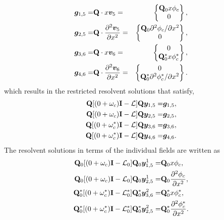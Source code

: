 \begin{align}
	\boldsymbol{g}_{1,5} =& 	\mathbf{Q}\cdot x\boldsymbol{v}_{5} =&
	\begin{Bmatrix}
		\mathbf{Q}_{0}x\phi_{c} \\
		0
	\end{Bmatrix}, \nonumber \\
	\boldsymbol{g}_{2,5} =& 	\mathbf{Q}\cdot \dfrac{\partial^{2}\boldsymbol{v}_{5}}{\partial x^{2}} =&
	\begin{Bmatrix}
		\mathbf{Q}_{0}\partial^{2}\phi_{c}/\partial x^{2}	\\
		0
	\end{Bmatrix}, \nonumber \\
	\boldsymbol{g}_{3,6} =& 	\mathbf{Q}\cdot x\boldsymbol{v}_{6} =&
	\begin{Bmatrix}
		0	\\
		\mathbf{Q}^{*}_{0}x\phi^{*}_{c}
	\end{Bmatrix}, \nonumber \\
	\boldsymbol{g}_{4,6} =& 	\mathbf{Q}\cdot \dfrac{\partial^{2}\boldsymbol{v}_{6}}{\partial x^{2}} =&
	\begin{Bmatrix}
		0	\\
		\mathbf{Q}^{*}_{0}\partial^{2}\phi^{*}_{c}/\partial x^{2}
	\end{Bmatrix}. \nonumber
\end{align}
 which results in the restricted resolvent solutions that satisfy,
 \begin{subequations}
 	\label{eqn:GL_resolvents}
	 \begin{align}
	 	\mathbf{Q}[(0 + \omega_{c})\mathbf{I} - \mathcal{L}]\mathbf{Q}\boldsymbol{y}_{1,5} =& \boldsymbol{g}_{1,5}, \\
	 	\mathbf{Q}[(0 + \omega_{c})\mathbf{I} - \mathcal{L}]\mathbf{Q}\boldsymbol{y}_{2,5} =& \boldsymbol{g}_{2,5}, \\
	 	\mathbf{Q}[(0 + \omega^{*}_{c})\mathbf{I} - \mathcal{L}]\mathbf{Q}\boldsymbol{y}_{3,6} =& \boldsymbol{g}_{3,6}, \\
	 	\mathbf{Q}[(0 + \omega^{*}_{c})\mathbf{I} - \mathcal{L}]\mathbf{Q}\boldsymbol{y}_{4,6} =& \boldsymbol{g}_{4,6}. 
	 \end{align}
\end{subequations}
The resolvent solutions in terms of the individual fields are written as
 \begin{subequations}
 	\label{eqn:GL_sub_resolvents}
	 \begin{align}
	 	\mathbf{Q}_{0}[(0 + \omega_{c})\mathbf{I} - \mathcal{L}_{0}]\mathbf{Q}_{0}\boldsymbol{y}^{1}_{1,5} =& \mathbf{Q}_{0}x\phi_{c}, \\
	 	\mathbf{Q}_{0}[(0 + \omega_{c})\mathbf{I} - \mathcal{L}_{0}]\mathbf{Q}_{0}\boldsymbol{y}^{1}_{2,5} =& \mathbf{Q}_{0}\dfrac{\partial^{2}\phi_{c}}{\partial x^{2}}, \\
	 	\mathbf{Q}^{*}_{0}[(0 + \omega^{*}_{c})\mathbf{I} - \mathcal{L}^{*}_{0}]\mathbf{Q}^{*}_{0}\boldsymbol{y}^{2}_{3,6} =& \mathbf{Q}^{*}_{0}x\phi^{*}_{c}, \\
		\mathbf{Q}^{*}_{0}[(0 + \omega^{*}_{c})\mathbf{I} - \mathcal{L}^{*}_{0}]\mathbf{Q}^{*}_{0}\boldsymbol{y}^{2}_{2,5} =& \mathbf{Q}^{*}_{0}\dfrac{\partial^{2}\phi^{*}_{c}}{\partial x^{2}}.
	 \end{align}
\end{subequations}
